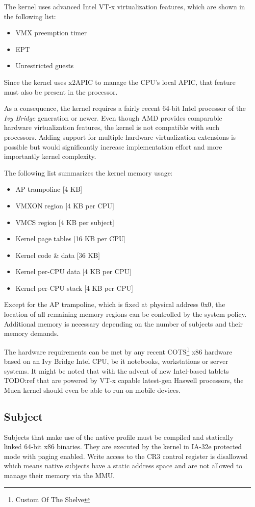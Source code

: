 The kernel uses advanced Intel VT-x virtualization features, which are shown in
the following list:

\begin{itemize}
	\item VMX preemption timer
	\item EPT
	\item Unrestricted guests
\end{itemize}

Since the kernel uses x2APIC to manage the CPU's local APIC, that feature must
also be present in the processor.

As a consequence, the kernel requires a fairly recent 64-bit Intel processor of
the \emph{Ivy Bridge} generation or newer. Even though AMD provides comparable
hardware virtualization features, the kernel is not compatible with such
processors. Adding support for multiple hardware virtualization extensions is
possible but would significantly increase implementation effort and more
importantly kernel complexity.

The following list summarizes the kernel memory usage:

\begin{itemize}
	\item AP trampoline [4 KB]
	\item VMXON region [4 KB per CPU]
	\item VMCS region [4 KB per subject]
	\item Kernel page tables [16 KB per CPU]
	\item Kernel code \& data [36 KB]
	\item Kernel per-CPU data  [4 KB per CPU]
	\item Kernel per-CPU stack [4 KB per CPU]
\end{itemize}

Except for the AP trampoline, which is fixed at physical address 0x0, the
location of all remaining memory regions can be controlled by the system policy.
Additional memory is necessary depending on the number of subjects and their
memory demands.

The hardware requirements can be met by any recent COTS\footnote{Custom Of The
Shelve} x86 hardware based on an Ivy Bridge Intel CPU, be it notebooks,
workstations or server systems. It might be noted that with the advent of new
Intel-based tablets TODO:ref that are powered by VT-x capable latest-gen Haswell
processors, the Muen kernel should even be able to run on mobile devices.

\subsection{Subject}
Subjects that make use of the native profile must be compiled and statically
linked 64-bit x86 binaries. They are executed by the kernel in IA-32e protected
mode with paging enabled. Write access to the CR3 control register is disallowed
which means native subjects have a static address space and are not allowed to
manage their memory via the MMU.

